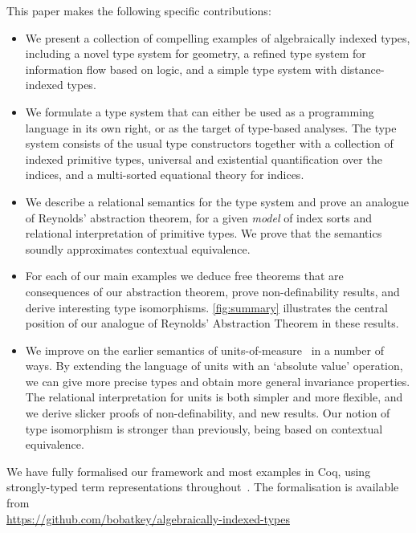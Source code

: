 This paper makes the following specific contributions:
\begin{itemize}
\item 
We present a collection of compelling examples of algebraically
indexed types, including a novel type system for geometry, a
refined type system for information flow based on logic, and a simple
type system with distance-indexed types.
\item 
We formulate a type system that can either be used as a programming
language in its own right, or as the target of type-based
analyses. The type system consists of the usual type constructors
together with a collection of indexed primitive types, universal and
existential quantification over the indices, and a multi-sorted
equational theory for indices.
\item
We describe a relational semantics for the type system and prove an
analogue of Reynolds' abstraction theorem, for a given \emph{model}
of index sorts and relational interpretation of primitive types.
We prove that the semantics soundly approximates contextual equivalence.
\item
For each of our main examples we deduce free theorems that are
consequences of our abstraction theorem, prove non-definability
results, and derive interesting type isomorphisms. \autoref{fig:summary}
illustrates the central position of our analogue of Reynolds' Abstraction
Theorem in these results.
\item
We improve on the earlier semantics of
units-of-measure~\cite{kennedy97relational} in a number of ways.  By
extending the language of units with an `absolute value' operation, we
can give more precise types and obtain more general invariance
properties.  The relational interpretation for units is both simpler
and more flexible, and we derive slicker proofs of non-definability,
and new results.  Our notion of type isomorphism is stronger than
previously, being based on contextual equivalence.
\end{itemize}
We have fully formalised our framework and most examples in Coq,
using strongly-typed term representations
throughout~\cite{TypedSyntax}. The formalisation is available from
\\{\small \url{https://github.com/bobatkey/algebraically-indexed-types}}




